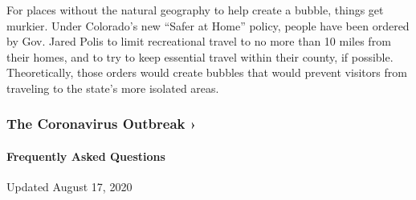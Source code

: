 For places without the natural geography to help create a bubble, things
get murkier. Under Colorado's new ``Safer at Home'' policy, people have
been ordered by Gov. Jared Polis to limit recreational travel to no more
than 10 miles from their homes, and to try to keep essential travel
within their county, if possible. Theoretically, those orders would
create bubbles that would prevent visitors from traveling to the state's
more isolated areas.

\href{https://www.nytimes3xbfgragh.onion/news-event/coronavirus?action=click\&pgtype=Article\&state=default\&region=MAIN_CONTENT_3\&context=storylines_faq}{}

\hypertarget{the-coronavirus-outbreak-}{%
\subsubsection{The Coronavirus Outbreak
›}\label{the-coronavirus-outbreak-}}

\hypertarget{frequently-asked-questions}{%
\paragraph{Frequently Asked
Questions}\label{frequently-asked-questions}}

Updated August 17, 2020

